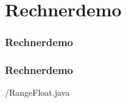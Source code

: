 \def\stitle{Rechnerdemo}
\section{\stitle}
\begin{frame}
\frametitle{\stitle}%
\tableofcontents[current]%
\end{frame}

\begin{frame}[fragile]%
  \frametitle{\stitle}%


{\getexercisefolder/RangeFloat.java}
\end{frame}
